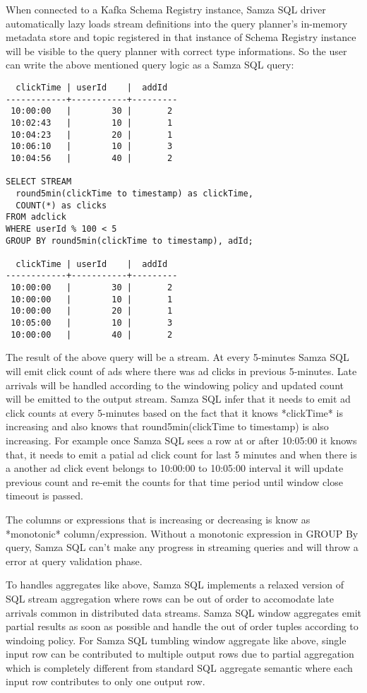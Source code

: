 \documentclass[10pt, conference, compsocconf]{IEEEtran}
\begin{document}
When connected to a Kafka Schema Registry instance, Samza SQL driver automatically lazy loads stream definitions into the query planner's in-memory metadata store and topic registered in that instance of Schema Registry instance will be visible to the query planner with correct type informations. So the user can write the above mentioned  query logic as a Samza SQL query:

\begin{lstlisting}
  clickTime | userId    |  addId 
------------+-----------+---------
 10:00:00   |        30 |       2 
 10:02:43   |        10 |       1  
 10:04:23   |        20 |       1  
 10:06:10   |        10 |       3  
 10:04:56   |        40 |       2 

SELECT STREAM 
  round5min(clickTime to timestamp) as clickTime,
  COUNT(*) as clicks
FROM adclick
WHERE userId % 100 < 5
GROUP BY round5min(clickTime to timestamp), adId;

  clickTime | userId    |  addId 
------------+-----------+---------
 10:00:00   |        30 |       2 
 10:00:00   |        10 |       1  
 10:00:00   |        20 |       1  
 10:05:00   |        10 |       3  
 10:00:00   |        40 |       2
 \end{lstlisting}

 The result of the above query will be a stream. At every 5-minutes Samza SQL will emit click count of ads where there was ad clicks in previous 5-minutes. Late arrivals will be handled according to the windowing policy and updated count will be emitted to the output stream. Samza SQL infer that it needs to emit ad click counts at every 5-minutes based on the fact that it knows *clickTime* is increasing  and also knows that round5min(clickTime to timestamp) is also increasing. For example once Samza SQL sees a row at or after 10:05:00 it knows that, it needs to emit a patial ad click count for last 5 minutes and when there is a another ad click event belongs to 10:00:00 to 10:05:00 interval it will update previous count and re-emit the counts for that time period until window close timeout is passed. 

The columns or expressions that is increasing or decreasing is know as *monotonic* column/expression. Without a monotonic expression in GROUP By query, Samza SQL can't make any progress in streaming queries and will throw a error at query validation phase. 

To handles aggregates like above, Samza SQL implements a relaxed version of SQL stream aggregation where rows can be out of order to accomodate late arrivals common in distributed data streams. Samza SQL window aggregates emit partial results as soon as possible and handle the out of order tuples according to windoing policy. For Samza SQL tumbling window aggregate like above, single input row can be contributed to multiple output rows due to partial aggregation which is completely different from standard SQL aggregate semantic where each input row contributes to only one output row.
\end{document}
